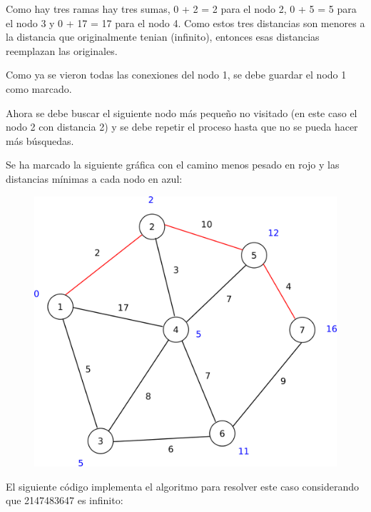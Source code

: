 \documentclass{article}
\begin{document}
Como hay tres ramas hay tres sumas, 0 + 2 = 2 para el nodo 2, 0 + 5 = 5 para el nodo 3 y 0 + 17 = 17 para el nodo 4. Como estos tres distancias son menores a la distancia que originalmente tenian (infinito), entonces esas distancias reemplazan las originales.

Como ya se vieron todas las conexiones del nodo 1, se debe guardar el nodo 1 como marcado.

Ahora se debe buscar el siguiente nodo más pequeño no visitado (en este caso el nodo 2 con distancia 2) y se debe repetir el proceso hasta que no se pueda hacer más búsquedas.

Se ha marcado la siguiente gráfica con el camino menos pesado en rojo y las distancias mínimas a cada nodo en azul:

\begin{figure}[H]
    \centering
    \includegraphics[width=0.42\paperwidth]{dijkstracamino}
\end{figure}

El siguiente código implementa el algoritmo para resolver este caso considerando que 2147483647 es infinito:
\end{document}
